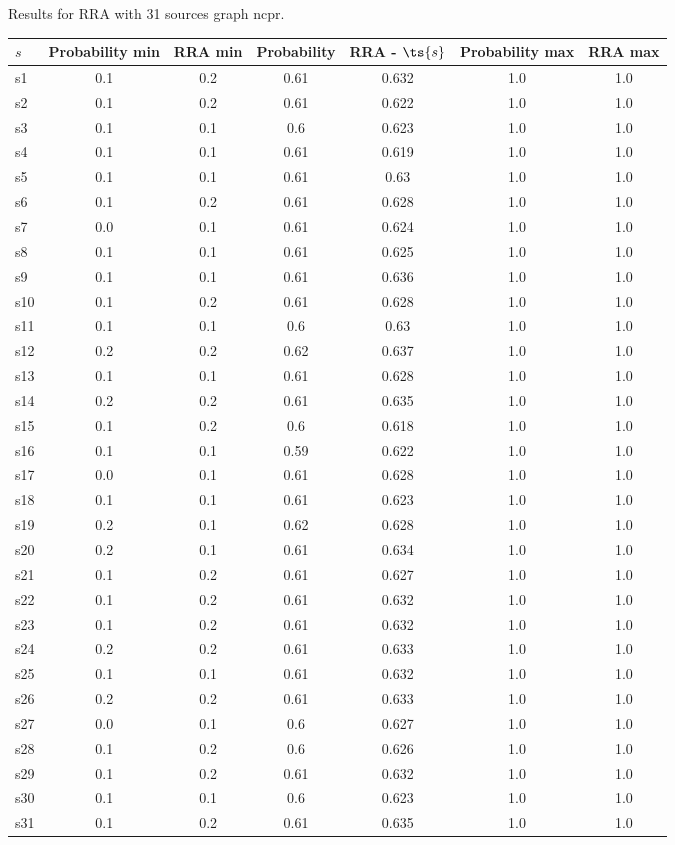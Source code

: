\documentclass{article}
\begin{document}
\noindent Results for RRA with 31 sources graph ncpr.

\noindent\begin{tabular}{|l|c|c|c|c|c|c|}
\hline
$s$& Probability min & RRA min & Probability & RRA - $\ts{s}$ & Probability max & RRA max\\
\hline
s1 &0.1 & 0.2 & 0.61 & 0.632 & 1.0 & 1.0\\
\hline
s2 &0.1 & 0.2 & 0.61 & 0.622 & 1.0 & 1.0\\
\hline
s3 &0.1 & 0.1 & 0.6 & 0.623 & 1.0 & 1.0\\
\hline
s4 &0.1 & 0.1 & 0.61 & 0.619 & 1.0 & 1.0\\
\hline
s5 &0.1 & 0.1 & 0.61 & 0.63 & 1.0 & 1.0\\
\hline
s6 &0.1 & 0.2 & 0.61 & 0.628 & 1.0 & 1.0\\
\hline
s7 &0.0 & 0.1 & 0.61 & 0.624 & 1.0 & 1.0\\
\hline
s8 &0.1 & 0.1 & 0.61 & 0.625 & 1.0 & 1.0\\
\hline
s9 &0.1 & 0.1 & 0.61 & 0.636 & 1.0 & 1.0\\
\hline
s10 &0.1 & 0.2 & 0.61 & 0.628 & 1.0 & 1.0\\
\hline
s11 &0.1 & 0.1 & 0.6 & 0.63 & 1.0 & 1.0\\
\hline
s12 &0.2 & 0.2 & 0.62 & 0.637 & 1.0 & 1.0\\
\hline
s13 &0.1 & 0.1 & 0.61 & 0.628 & 1.0 & 1.0\\
\hline
s14 &0.2 & 0.2 & 0.61 & 0.635 & 1.0 & 1.0\\
\hline
s15 &0.1 & 0.2 & 0.6 & 0.618 & 1.0 & 1.0\\
\hline
s16 &0.1 & 0.1 & 0.59 & 0.622 & 1.0 & 1.0\\
\hline
s17 &0.0 & 0.1 & 0.61 & 0.628 & 1.0 & 1.0\\
\hline
s18 &0.1 & 0.1 & 0.61 & 0.623 & 1.0 & 1.0\\
\hline
s19 &0.2 & 0.1 & 0.62 & 0.628 & 1.0 & 1.0\\
\hline
s20 &0.2 & 0.1 & 0.61 & 0.634 & 1.0 & 1.0\\
\hline
s21 &0.1 & 0.2 & 0.61 & 0.627 & 1.0 & 1.0\\
\hline
s22 &0.1 & 0.2 & 0.61 & 0.632 & 1.0 & 1.0\\
\hline
s23 &0.1 & 0.2 & 0.61 & 0.632 & 1.0 & 1.0\\
\hline
s24 &0.2 & 0.2 & 0.61 & 0.633 & 1.0 & 1.0\\
\hline
s25 &0.1 & 0.1 & 0.61 & 0.632 & 1.0 & 1.0\\
\hline
s26 &0.2 & 0.2 & 0.61 & 0.633 & 1.0 & 1.0\\
\hline
s27 &0.0 & 0.1 & 0.6 & 0.627 & 1.0 & 1.0\\
\hline
s28 &0.1 & 0.2 & 0.6 & 0.626 & 1.0 & 1.0\\
\hline
s29 &0.1 & 0.2 & 0.61 & 0.632 & 1.0 & 1.0\\
\hline
s30 &0.1 & 0.1 & 0.6 & 0.623 & 1.0 & 1.0\\
\hline
s31 &0.1 & 0.2 & 0.61 & 0.635 & 1.0 & 1.0\\
\hline
\end{tabular}\\
\end{document}
